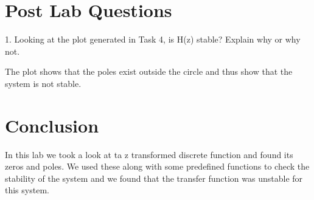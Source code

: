 \documentclass[12pt,a4paper]{article}
\begin{document}
\section*{Post Lab Questions}

1. Looking at the plot generated in Task 4, is H(z) stable? Explain why or why not.\vspace{12pt}

The plot shows that the poles exist outside the circle and thus show that the system is not stable. 

\section*{Conclusion}

In this lab we took a look at ta z transformed discrete function and found its zeros and poles. We used these along with some predefined functions to check the stability of the system and we found that the transfer function was unstable for this system. 	
\end{document}
